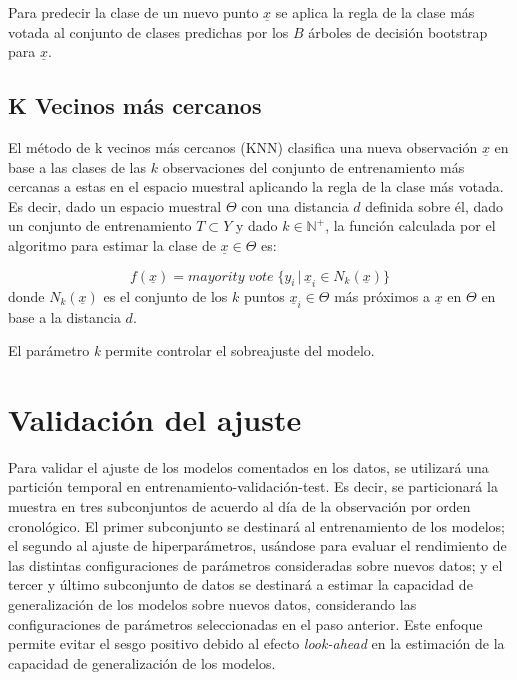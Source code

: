 \documentclass[12pt,a4paper,]{book}
\numberwithin{dummy}{section}
\theoremstyle{ocrenumbox}
\theoremstyle{blacknumex}
\theoremstyle{blacknumbox}
\theoremstyle{ocrenum}
\theoremstyle{ocrenum}
\begin{document}
Para predecir la clase de un nuevo punto \(\underline x\) se aplica la
regla de la clase más votada al conjunto de clases predichas por los
\(B\) árboles de decisión bootstrap para \(\underline x\).

\hypertarget{k-vecinos-muxe1s-cercanos}{%
\subsection{K Vecinos más cercanos}\label{k-vecinos-muxe1s-cercanos}}

El método de k vecinos más cercanos (KNN) clasifica una nueva
observación \(\underline x\) en base a las clases de las \(k\)
observaciones del conjunto de entrenamiento más cercanas a estas en el
espacio muestral aplicando la regla de la clase más votada. Es decir,
dado un espacio muestral \(\Theta\) con una distancia \(d\) definida
sobre él, dado un conjunto de entrenamiento \(T \subset Y\) y dado
\(k \in \mathbb{N^+}\), la función calculada por el algoritmo para
estimar la clase de \(\underline x \in \Theta\) es:

\[f(\underline x) = mayority\; vote\;\{ y_i \,| \, \underline x_i \in N_k(\underline x)\}\]
donde \(N_k(\underline x)\) es el conjunto de los \(k\) puntos
\(\underline x_i \in \Theta\) más próximos a \(\underline x\) en
\(\Theta\) en base a la distancia \(d\).

El parámetro \emph{k} permite controlar el sobreajuste del modelo.

\hypertarget{validaciuxf3n-del-ajuste}{%
\section{Validación del ajuste}\label{validaciuxf3n-del-ajuste}}

Para validar el ajuste de los modelos comentados en los datos, se
utilizará una partición temporal en entrenamiento-validación-test. Es
decir, se particionará la muestra en tres subconjuntos de acuerdo al día
de la observación por orden cronológico. El primer subconjunto se
destinará al entrenamiento de los modelos; el segundo al ajuste de
hiperparámetros, usándose para evaluar el rendimiento de las distintas
configuraciones de parámetros consideradas sobre nuevos datos; y el
tercer y último subconjunto de datos se destinará a estimar la capacidad
de generalización de los modelos sobre nuevos datos, considerando las
configuraciones de parámetros seleccionadas en el paso anterior. Este
enfoque permite evitar el sesgo positivo debido al efecto
\emph{look-ahead} en la estimación de la capacidad de generalización de
los modelos.
\end{document}
